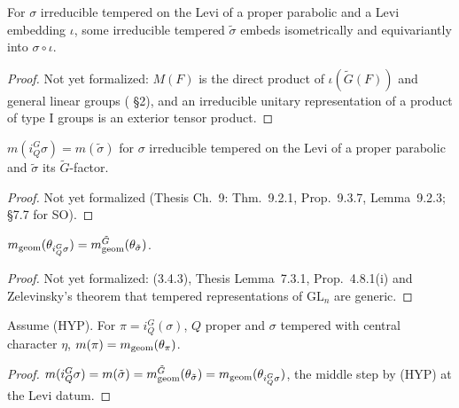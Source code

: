\begin{lemma}
\label{exists_leviFactor}
\leanok
{}
For $\sigma$ irreducible tempered on the Levi of a proper parabolic and a Levi embedding $\iota$, some irreducible
tempered $\tilde\sigma$ embeds isometrically and equivariantly into $\sigma\circ\iota$.
\end{lemma}
\begin{proof}
Not yet formalized: $M(F)$ is the direct product of $\iota(\tilde G(F))$ and general linear groups (\cite{Asgari} \S2), and an
irreducible unitary representation of a product of type I groups is an exterior tensor product.
\end{proof}

\begin{theorem}
\label{mult_parInd_eq_mult_leviFactor}
\leanok
{}
$m(i_Q^G\sigma)=m(\tilde\sigma)$ for $\sigma$ irreducible tempered on the Levi of a proper parabolic and
$\tilde\sigma$ its $\tilde G$-factor.
\end{theorem}
\begin{proof}
Not yet formalized (Thesis Ch.~9: Thm.~9.2.1, Prop.~9.3.7, Lemma~9.2.3; \cite{Wal12} \S7.7 for SO).
\end{proof}

\begin{theorem}
\label{mGeom_charG_parInd_eq}
\leanok
{}
$m_{\mathrm{geom}}(\theta_{i_Q^G\sigma})=m_{\mathrm{geom}}^{\tilde G}(\theta_{\tilde\sigma})$.
\end{theorem}
\begin{proof}
Not yet formalized: \cite{BP} (3.4.3), Thesis Lemma~7.3.1, \cite{BP} Prop.~4.8.1(i) and Zelevinsky's theorem
that tempered representations of $\mathrm{GL}_n$ are generic.
\end{proof}

\begin{proposition}
\label{mult_parInd_eq_mGeom}
\leanok
{}
Assume (HYP). For $\pi=i_Q^G(\sigma)$, $Q$ proper and $\sigma$ tempered with central character $\eta$,
$m(\pi)=m_{\mathrm{geom}}(\theta_\pi)$.
\end{proposition}
\begin{proof}
\leanok
{}
$m(i_Q^G\sigma)=m(\tilde\sigma)=m_{\mathrm{geom}}^{\tilde G}(\theta_{\tilde\sigma})=m_{\mathrm{geom}}(\theta_{i_Q^G\sigma})$, the middle
step by (HYP) at the Levi datum.
\end{proof}


